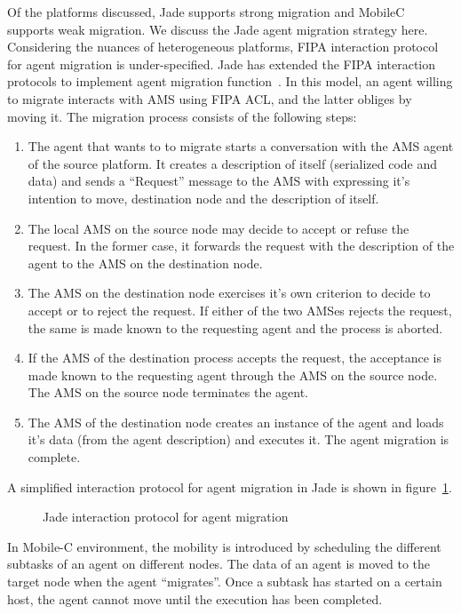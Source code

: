 Of the platforms discussed, Jade supports strong migration and MobileC supports weak migration. We discuss the Jade agent
migration strategy here. Considering the nuances of heterogeneous platforms, FIPA interaction protocol for agent migration 
is under-specified. Jade has extended the FIPA interaction protocols to implement agent migration function~\citep{Ametller:2003}. 
In this model, an agent willing to migrate interacts with AMS using FIPA ACL, and the latter obliges by moving it.
%
The migration process consists of the following steps:
\begin{enumerate}
	\item The agent that wants to to migrate starts a conversation with the AMS agent of the source platform. It creates
		a description of itself (serialized code and data) and sends a ``Request'' message to the AMS with expressing
		it's intention to move, destination node and the description of itself.
	\item The local AMS on the source node may decide to accept or refuse the request. In the former case, it forwards the 
		request with the description of the agent to the AMS on the destination node. 
	\item The AMS on the destination node exercises it's own criterion to decide to accept or to reject the request. If either
		of the two AMSes rejects the request, the same is made known to the requesting agent and the process is aborted.
	\item If the AMS of the destination process accepts the request, the acceptance is made known to the requesting agent
		through the AMS on the source node. The AMS on the source node terminates the agent.
	\item The AMS of the destination node creates an instance of the agent and loads it's data (from the agent description)
		and executes it. The agent migration is complete.
\end{enumerate}

\noindent
A simplified interaction protocol for agent migration in Jade is shown in figure~\ref{fig:agents:migration}.

\begin{figure}[!htbp]
	\centering
	\caption{Jade interaction protocol for agent migration}
	\label{fig:agents:migration}
\end{figure}

In Mobile-C environment, the mobility is introduced by scheduling the different subtasks of an agent on different nodes. The data 
of an agent is moved to the target node when the agent ``migrates''. Once a subtask has started on a certain host, the agent 
cannot move until the execution has been completed.


